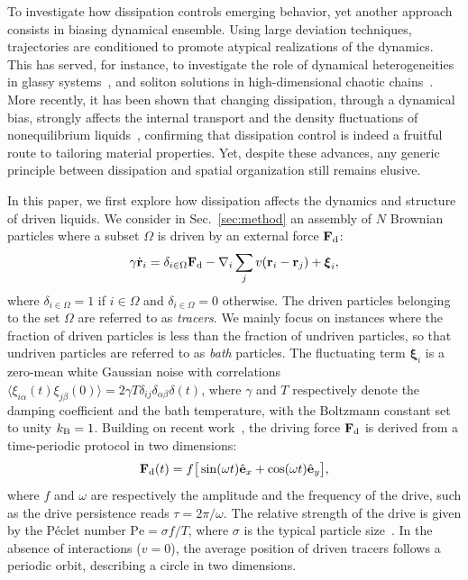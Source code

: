 \documentclass[pre, superscriptaddress, twocolumn,pre]{revtex4-1}
\begin{document}
To investigate how dissipation controls emerging behavior, yet another approach consists in biasing dynamical ensemble. Using large deviation techniques, trajectories are conditioned to promote atypical realizations of the dynamics. This has served, for instance, to investigate the role of dynamical heterogeneities in glassy systems~\cite{garrahan2007, Hedges2009, Pitard2011, Speck2012, Bodineau2012a, Limmer2014, Nemoto2017}, and soliton solutions in high-dimensional chaotic chains~\cite{tailleur2007probing, laffargue2013}. More recently, it has been shown that changing dissipation, through a dynamical bias, strongly affects the internal transport and the density fluctuations of nonequilibrium liquids~\cite{Cagnetta2017, nemoto2018optimizing}, confirming that dissipation control is indeed a fruitful route to tailoring material properties. Yet, despite these advances, any generic principle between dissipation and spatial organization still remains elusive.


In this paper, we first explore how dissipation affects the dynamics and structure of driven liquids. We consider in Sec.~\ref{sec:method} an assembly of $N$ Brownian particles where a subset $\Omega$ is driven by an external force ${\bf F}_{\rm d}$:
\begin{equation}\label{eq:dyn}
	\gamma\dot{\bf r}_i = \delta_{i\in\Omega}{\bf F}_{\rm d} - \nabla_i \sum_j v({\bf r}_i-{\bf r}_j) + {\boldsymbol\xi}_i ,
\end{equation}
where $\delta_{i\in\Omega}=1$ if $i\in\Omega$ and $\delta_{i\in\Omega}=0$ otherwise. The driven particles belonging to the set $\Omega$ are referred to as \textit{tracers}. We mainly focus on instances where the fraction of driven particles is less than the fraction of undriven particles, so that undriven particles are referred to as \textit{bath} particles. The fluctuating term ${\boldsymbol\xi}_i$ is a zero-mean white Gaussian noise with correlations $\langle\xi_{i\alpha}(t)\xi_{j\beta}(0)\rangle=2\gamma T\delta_{ij}\delta_{\alpha\beta}\delta(t)$, where $\gamma$ and $T$ respectively denote the damping coefficient and the bath temperature, with the Boltzmann constant set to unity $k_{\rm B}=1$. Building on recent work~\cite{Han2016, delJunco2018}, the driving force ${\bf F}_\text{d}$ is derived from a time-periodic protocol in two dimensions:
\begin{equation}\label{eq:theta}
	{\bf F}_{\rm d}(t) = f \big[\sin(\omega t) \hat{\bf e}_x + \cos(\omega t)\hat{\bf e}_y \big] ,
\end{equation}
where $f$ and $\omega$ are respectively the amplitude and the frequency of the drive, such as the drive persistence reads $\tau=2\pi/\omega$. The relative strength of the drive is given by the P\'eclet number $\text{Pe} = \sigma f/T$, where $\sigma$ is the typical particle size~\cite{Han2016, delJunco2018}. In the absence of interactions ($v=0$), the average position of driven tracers follows a periodic orbit, describing a circle in two dimensions.
\end{document}
